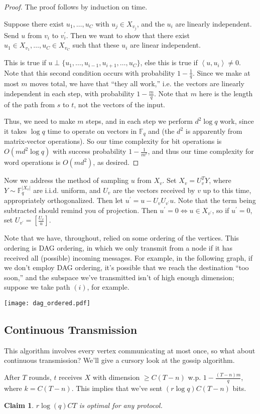 \documentclass[11pt]{article}
\newcommand{\F}{\mathbb{F}}
\newtheorem{claim}[theorem]{Claim}
\begin{document}
\begin{proof}
The proof follows by induction on time.

Suppose there exist $u_1, \dots, u_C$ with $u_j \in X_{v_j}$, and the $u_i$ are linearly independent. Send $u$ from $v_i$ to $v_i^\prime$. Then we want to show that there exist $u_1 \in X_{v_1}, \dots, u_C \in X_{v_C}$ such that these $u_i$ are linear independent.

This is true if $u \perp \{u_1, \ldots, u_{i-1}, u_{i+1}, \ldots, u_C\}$, else this is true if $\left<u, u_i\right> \neq 0$. Note that this second condition occurs with probability $1 - \frac{1}{q}$.  Since we make at most $m$ moves total, we have that ``they all work,'' i.e. the vectors are linearly independent in each step, with probability $1 - \frac{m}{q}$. Note that $m$ here is the length of the path from $s$ to $t$, not the vectors of the input.

Thus, we need to make $m$ steps, and in each step we perform $d^2\log q$ work, since it takes $\log q$ time to operate on vectors in $\F_q$ and (the $d^2$ is apparently from matrix-vector operations).  So our time complexity for bit operations is $O(md^2 \log q)$ with success probability $1 - \frac{1}{m^c}$, and thus our time complexity for word operations is $O(md^2)$, as desired.
\end{proof}

Now we address the method of sampling $u$ from $X_v$. Set $X_v = U_v^TY$, where $Y \sim \F_q^{|X_v|}$ are i.i.d. uniform, and $U_v$ are the vectors received by $v$ up to this time, appropriately orthogonalized. Then let $u^\prime = u - U_vU_{v^\prime}u$. Note that the term being subtracted should remind you of projection. Then $u^\prime = 0 \iff u \in X_{v^\prime}$, so if $u^\prime = 0$, set $U_{v^\prime} = \left[\frac{U_v}{u}\right]$.

Note that we have, throughout, relied on some ordering of the vertices. This ordering is DAG ordering, in which we only transmit from a node if it has received all (possible) incoming messages. For example, in the following graph, if we don't employ DAG ordering, it's possible that we reach the destination ``too soon,'' and the subspace we've transmitted isn't of high enough dimension; suppose we take path $(i)$, for example.

\begin{center}
\texttt{[image: dag\_ordered.pdf]}
\end{center}

\subsection{Continuous Transmission}

This algorithm involves every vertex communicating at most once, so what about continuous transmission?  We'll give a cursory look at the gossip algorithm.

After $T$ rounds, $t$ receives $X$ with dimension $\geq C(T-n)$ w.p. $1 - \frac{(T - n)m}{q}$, where $k = C(T-n)$. This implies that we've sent $(r\log q)C(T-n)$ bits.

\begin{claim}
$r\log(q) CT$ is optimal for any protocol.
\end{claim}
\end{document}
